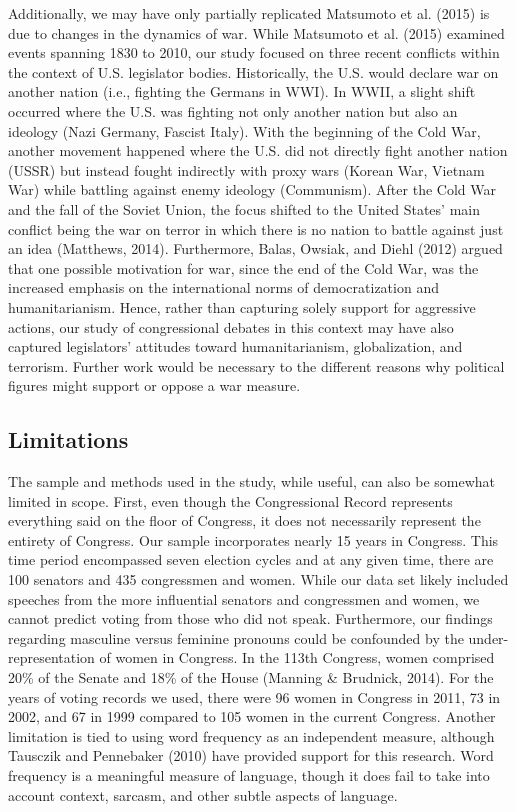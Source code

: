 \documentclass[english,,man,floatsintext]{apa6}
\begin{document}
Additionally, we may have only partially replicated Matsumoto et al. (2015) is due to changes in the dynamics of war. While Matsumoto et al. (2015) examined events spanning 1830 to 2010, our study focused on three recent conflicts within the context of U.S. legislator bodies. Historically, the U.S. would declare war on another nation (i.e., fighting the Germans in WWI). In WWII, a slight shift occurred where the U.S. was fighting not only another nation but also an ideology (Nazi Germany, Fascist Italy). With the beginning of the Cold War, another movement happened where the U.S. did not directly fight another nation (USSR) but instead fought indirectly with proxy wars (Korean War, Vietnam War) while battling against enemy ideology (Communism). After the Cold War and the fall of the Soviet Union, the focus shifted to the United States' main conflict being the war on terror in which there is no nation to battle against just an idea (Matthews, 2014). Furthermore, Balas, Owsiak, and Diehl (2012) argued that one possible motivation for war, since the end of the Cold War, was the increased emphasis on the international norms of democratization and humanitarianism. Hence, rather than capturing solely support for aggressive actions, our study of congressional debates in this context may have also captured legislators' attitudes toward humanitarianism, globalization, and terrorism. Further work would be necessary to the different reasons why political figures might support or oppose a war measure.

\hypertarget{limitations}{%
\subsection{Limitations}\label{limitations}}

The sample and methods used in the study, while useful, can also be somewhat limited in scope. First, even though the Congressional Record represents everything said on the floor of Congress, it does not necessarily represent the entirety of Congress. Our sample incorporates nearly 15 years in Congress. This time period encompassed seven election cycles and at any given time, there are 100 senators and 435 congressmen and women. While our data set likely included speeches from the more influential senators and congressmen and women, we cannot predict voting from those who did not speak. Furthermore, our findings regarding masculine versus feminine pronouns could be confounded by the under-representation of women in Congress. In the 113th Congress, women comprised 20\% of the Senate and 18\% of the House (Manning \& Brudnick, 2014). For the years of voting records we used, there were 96 women in Congress in 2011, 73 in 2002, and 67 in 1999 compared to 105 women in the current Congress. Another limitation is tied to using word frequency as an independent measure, although Tausczik and Pennebaker (2010) have provided support for this research. Word frequency is a meaningful measure of language, though it does fail to take into account context, sarcasm, and other subtle aspects of language.
\end{document}
